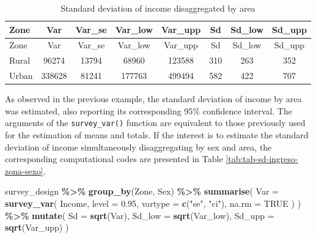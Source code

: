 \documentclass[
  english,
  12pt,
]{book}
\newenvironment{Shaded}{\begin{snugshade}}{\end{snugshade}}
\newcommand{\AttributeTok}[1]{\textcolor[rgb]{0.13,0.29,0.53}{#1}}
\newcommand{\ConstantTok}[1]{\textcolor[rgb]{0.56,0.35,0.01}{#1}}
\newcommand{\FloatTok}[1]{\textcolor[rgb]{0.00,0.00,0.81}{#1}}
\newcommand{\FunctionTok}[1]{\textcolor[rgb]{0.13,0.29,0.53}{\textbf{#1}}}
\newcommand{\NormalTok}[1]{#1}
\newcommand{\SpecialCharTok}[1]{\textcolor[rgb]{0.81,0.36,0.00}{\textbf{#1}}}
\newcommand{\StringTok}[1]{\textcolor[rgb]{0.31,0.60,0.02}{#1}}
\begin{document}
\begin{longtable}[]{@{}lccccccc@{}}
\caption{\label{tab:tab-sd-ingreso-zona}Standard deviation of income disaggregated by area}\tabularnewline
\toprule\noalign{}
Zone & Var & Var\_se & Var\_low & Var\_upp & Sd & Sd\_low & Sd\_upp \\
\midrule\noalign{}
\endfirsthead
\toprule\noalign{}
Zone & Var & Var\_se & Var\_low & Var\_upp & Sd & Sd\_low & Sd\_upp \\
\midrule\noalign{}
\endhead
\bottomrule\noalign{}
\endlastfoot
Rural & 96274 & 13794 & 68960 & 123588 & 310 & 263 & 352 \\
Urban & 338628 & 81241 & 177763 & 499494 & 582 & 422 & 707 \\
\end{longtable}

As observed in the previous example, the standard deviation of income by area was estimated, also reporting its corresponding 95\% confidence interval. The arguments of the \texttt{survey\_var()} function are equivalent to those previously used for the estimation of means and totals. If the interest is to estimate the standard deviation of income simultaneously disaggregating by sex and area, the corresponding computational codes are presented in Table \ref{tab:tab-sd-ingreso-zona-sexo}.

\begin{Shaded}
\begin{Highlighting}[]
\NormalTok{survey\_design }\SpecialCharTok{\%\textgreater{}\%}
  \FunctionTok{group\_by}\NormalTok{(Zone, Sex) }\SpecialCharTok{\%\textgreater{}\%}
  \FunctionTok{summarise}\NormalTok{(}
    \AttributeTok{Var =} \FunctionTok{survey\_var}\NormalTok{(}
\NormalTok{      Income,}
      \AttributeTok{level =} \FloatTok{0.95}\NormalTok{,}
      \AttributeTok{vartype =} \FunctionTok{c}\NormalTok{(}\StringTok{"se"}\NormalTok{, }\StringTok{"ci"}\NormalTok{),}
      \AttributeTok{na.rm =} \ConstantTok{TRUE}
\NormalTok{    )}
\NormalTok{  ) }\SpecialCharTok{\%\textgreater{}\%}
  \FunctionTok{mutate}\NormalTok{(}
    \AttributeTok{Sd     =} \FunctionTok{sqrt}\NormalTok{(Var),}
    \AttributeTok{Sd\_low =} \FunctionTok{sqrt}\NormalTok{(Var\_low),}
    \AttributeTok{Sd\_upp =} \FunctionTok{sqrt}\NormalTok{(Var\_upp)}
\NormalTok{  )}
\end{Highlighting}
\end{Shaded}
\end{document}
